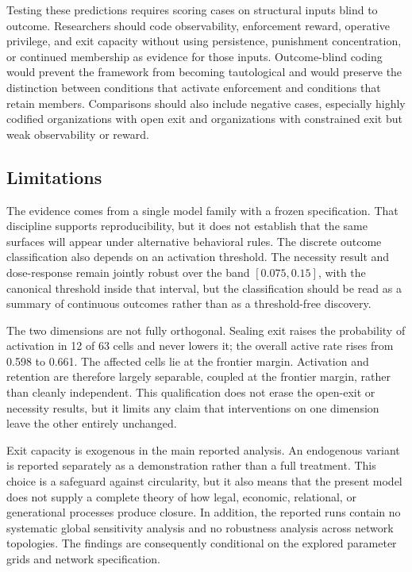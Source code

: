 \documentclass[12pt]{article}
\begin{document}
Testing these predictions requires scoring cases on structural inputs blind to outcome. Researchers should code observability, enforcement reward, operative privilege, and exit capacity without using persistence, punishment concentration, or continued membership as evidence for those inputs. Outcome-blind coding would prevent the framework from becoming tautological and would preserve the distinction between conditions that activate enforcement and conditions that retain members. Comparisons should also include negative cases, especially highly codified organizations with open exit and organizations with constrained exit but weak observability or reward.

\subsection{Limitations}

The evidence comes from a single model family with a frozen specification. That discipline supports reproducibility, but it does not establish that the same surfaces will appear under alternative behavioral rules. The discrete outcome classification also depends on an activation threshold. The necessity result and dose-response remain jointly robust over the band $[0.075,0.15]$, with the canonical threshold inside that interval, but the classification should be read as a summary of continuous outcomes rather than as a threshold-free discovery.

The two dimensions are not fully orthogonal. Sealing exit raises the probability of activation in 12 of 63 cells and never lowers it; the overall active rate rises from 0.598 to 0.661. The affected cells lie at the frontier margin. Activation and retention are therefore largely separable, coupled at the frontier margin, rather than cleanly independent. This qualification does not erase the open-exit or necessity results, but it limits any claim that interventions on one dimension leave the other entirely unchanged.

Exit capacity is exogenous in the main reported analysis. An endogenous variant is reported separately as a demonstration rather than a full treatment. This choice is a safeguard against circularity, but it also means that the present model does not supply a complete theory of how legal, economic, relational, or generational processes produce closure. In addition, the reported runs contain no systematic global sensitivity analysis and no robustness analysis across network topologies. The findings are consequently conditional on the explored parameter grids and network specification.
\end{document}
